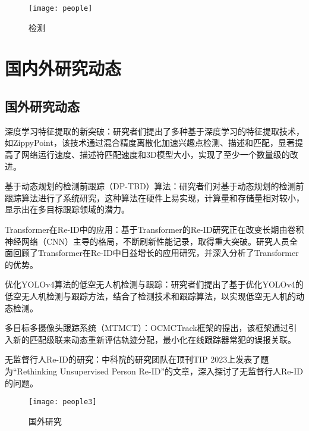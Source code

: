 \begin{figure}[htbp] %
	\centering
	\texttt{[image: people]} %
	\caption{检测} %
	\label{fig:people} %
\end{figure}


\section{国内外研究动态}

\subsection{国外研究动态}

深度学习特征提取的新突破：研究者们提出了多种基于深度学习的特征提取技术，如ZippyPoint，该技术通过混合精度离散化加速兴趣点检测、描述和匹配，显著提高了网络运行速度、描述符匹配速度和3D模型大小，实现了至少一个数量级的改进。

基于动态规划的检测前跟踪（DP-TBD）算法：研究者们对基于动态规划的检测前跟踪算法进行了系统研究，这种算法在硬件上易实现，计算量和存储量相对较小，显示出在多目标跟踪领域的潜力\cite{lynch2017introduction}。

Transformer在Re-ID中的应用：基于Transformer的Re-ID研究正在改变长期由卷积神经网络（CNN）主导的格局，不断刷新性能记录，取得重大突破。研究人员全面回顾了Transformer在Re-ID中日益增长的应用研究，并深入分析了Transformer的优势。

优化YOLOv4算法的低空无人机检测与跟踪：研究者们提出了基于优化YOLOv4的低空无人机检测与跟踪方法，结合了检测技术和跟踪算法，以实现低空无人机的动态检测\cite{一种行人与自动驾驶车辆的交互博弈均衡策略探究方法}。

多目标多摄像头跟踪系统（MTMCT）：OCMCTrack框架的提出，该框架通过引入新的匹配级联来动态重新评估轨迹分配，最小化在线跟踪器常犯的误报关联\cite{}。

无监督行人Re-ID的研究：中科院的研究团队在顶刊TIP 2023上发表了题为“Rethinking Unsupervised Person Re-ID”的文章，深入探讨了无监督行人Re-ID的问题。

\begin{figure}[htbp] %
	\centering
	\texttt{[image: people3]} %
	\caption{国外研究} %
	\label{fig:people3} %
\end{figure}


